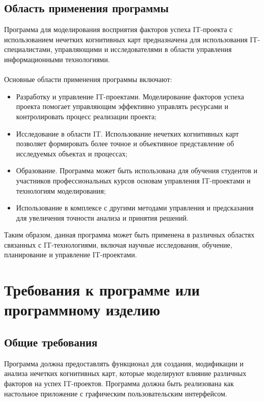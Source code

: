 \documentclass{article}
\begin{document}
    \subsection {Область применения программы}
    Программа для моделирования восприятия факторов успеха IT-проекта с использованием нечетких когнитивных карт предназначена для использования IT-специалистами, управляющими и исследователями в области управления информационными технологиями.\\
    ~\\
    Основные области применения программы включают:
    \begin{itemize}
        \item Разработку и управление IT-проектами. Моделирование факторов успеха проекта помогает управляющим эффективно управлять ресурсами и контролировать процесс реализации проекта;
        \item Исследование в области IT. Использование нечетких когнитивных карт позволяет формировать более точное и объективное представление об исследуемых объектах и процессах;
        \item Образование. Программа может быть использована для обучения студентов и участников профессиональных курсов основам управления IT-проектами и технологиям моделирования;
        \item Использование в комплексе с другими методами управления и предсказания для увеличения точности анализа и принятия решений.
    \end{itemize}
    Таким образом, данная программа может быть применена в различных областях связанных с IT-технологиями, включая научные исследования, обучение, планирование и управление IT-проектами.
    \newpage


    \section{Требования к программе или программному изделию}

    \subsection{Общие требования}
    Программа должна предоставлять функционал для создания, модификации и анализа нечетких когнитивных карт, которые моделируют влияние различных факторов на успех IT-проектов. Программа должна быть реализована как настольное приложение с графическим пользовательским интерфейсом.
\end{document}
